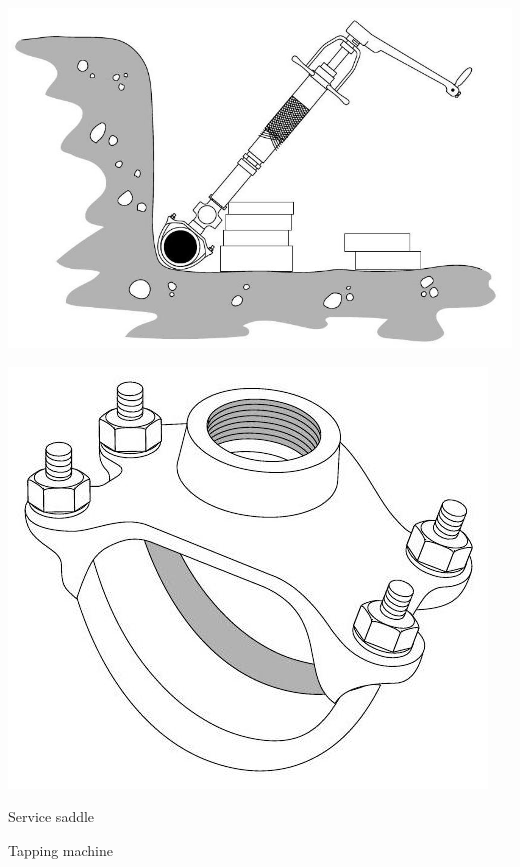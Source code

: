\documentclass[10pt]{article}
\begin{document}
\includegraphics[max width=\textwidth]{2022_11_03_fc0cbc2f3612fab6edd2g-26}

\includegraphics[max width=\textwidth]{ServiceSaddle}

Service saddle

Tapping machine
\end{document}
